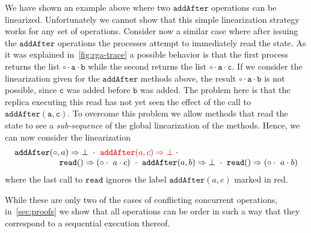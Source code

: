 We have shown an example above where two $\mathtt{addAfter}$
operations can be linearized.
%
Unfortunately we cannot show that this simple linearization strategy
works for any set of operations.
%
Consider now a similar case where after issuing the
$\mathtt{addAfter}$ operations the processes attempt to immediately
read the state.
%
As it was explained in~\autoref{fig:rga-trace} a possible behavior is
that the first process returns the list $\mathtt{\circ \cdot a \cdot
  b}$ while the second returns the list $\mathtt{\circ \cdot a \cdot
  c}$. 
%
If we consider the linearization given for the $\mathtt{addAfter}$
methods above, the result $\mathtt{\circ \cdot a \cdot b}$ is not
possible, since $\mathtt{c}$ was added before $\mathtt{b}$ was added.
%
The problem here is that the replica executing this read has not yet
seen the effect of the call to $\mathtt{addAfter(a, c)}$.
%
To overcome this problem we allow methods that read the state to see a
\emph{sub-sequence} of the global linearization of the methods.
%
Hence, we can now consider the linearization 
\[
  \begin{array}{c}
    \alabellong[\mathtt{addAfter}]{\circ,a}{\bot}\ \cdot\
    {\color{red} \alabellong[\mathtt{addAfter}]{a,c}{\bot}}\ \cdot \kern5cm\\    
    \hspace{\fill} \alabellong[\mathtt{read}]{}{(\circ \cdot\ a \cdot c)}\ \cdot\
    \alabellong[\mathtt{addAfter}]{a,b}{\bot}\ \cdot\
    \alabellong[\mathtt{read}]{}{(\circ \cdot\ a \cdot b)}
  \end{array}
\]
where the last call to $\mathtt{read}$ ignores the label
{\color{red} $\mathtt{addAfter}(a, c)$} marked in red.

While these are only two of the cases of conflicting concurrent
operations, in~\autoref{sec:proofs} we show that all operations
can be order in such a way that they correspond to a sequential
execution thereof.


